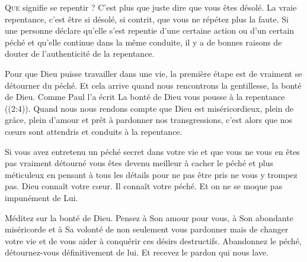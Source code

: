 \dvrule







\lettrine{Q}{ue} signifie \Og se repentir \Fg{}?
 C'est plus que juste dire que vous êtes désolé. La vraie repentance,
 c'est être si désolé, si contrit, que vous ne répétez plus la faute.
 Si une personne déclare qu'elle s'est repentie d'une certaine action
 ou d'un certain péché et qu'elle continue dans la même conduite,
 il y a de bonnes raisons de douter de l'authenticité de la repentance. 

Pour que Dieu puisse travailler dans une vie, la première étape
 est de vraiment se détourner du péché. Et cela arrive quand nous rencontrons
 la gentillesse, la bonté de Dieu. Comme Paul l'a écrit\frcolon{} 
 \Og La bonté de Dieu vous pousse à la repentance \Fg{} ((2:4)).
 Quand nous nous rendons compte que Dieu est miséricordieux, plein de grâce,
 plein d'amour et prêt à pardonner nos transgressions, c'est alors
 que nos c\oe{}urs sont attendris et conduits à la repentance. 


Si vous avez entretenu un péché secret dans votre vie et que vous ne vous
 en êtes pas vraiment détourné \ocadr vous êtes devenu meilleur à cacher
 le péché et plus méticuleux en pensant à tous les détails
 pour ne pas être pris \fcadr{} ne vous y trompez pas.
 Dieu connaît votre c\oe{}ur. Il connaît votre péché. Et on ne se moque pas impunément de Lui. 

Méditez sur la bonté de Dieu. Pensez à Son amour pour vous,
 à Son abondante miséricorde et à Sa volonté de non seulement
 vous pardonner mais de changer votre vie et de vous aider à conquérir
 ces désirs destructifs. Abandonnez le péché, détournez-vous définitivement
 de lui. Et recevez le pardon qui nous lave. 

\dvrule

